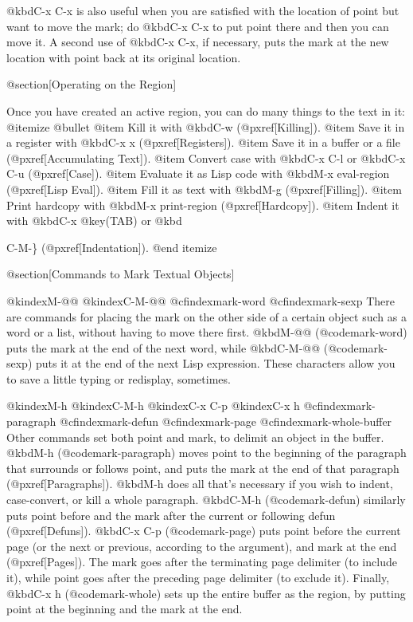 {{{{  @kbd{C-x C-x} is also useful when you are satisfied with the location of
point but want to move the mark; do @kbd{C-x C-x} to put point there and
then you can move it.  A second use of @kbd{C-x C-x}, if necessary, puts
the mark at the new location with point back at its original location.

@section[Operating on the Region]

  Once you have created an active region, you can do many things to
the text in it:
@itemize @bullet
@item
Kill it with @kbd{C-w} (@pxref[Killing]).
@item
Save it in a register with @kbd{C-x x} (@pxref[Registers]).
@item
Save it in a buffer or a file (@pxref[Accumulating Text]).
@item
Convert case with @kbd{C-x C-l} or @kbd{C-x C-u} (@pxref[Case]).
@item
Evaluate it as Lisp code with @kbd{M-x eval-region} (@pxref[Lisp Eval]).
@item
Fill it as text with @kbd{M-g} (@pxref[Filling]).
@item
Print hardcopy with @kbd{M-x print-region} (@pxref[Hardcopy]).
@item
Indent it with @kbd{C-x @key(TAB)} or @kbd{C-M-\} (@pxref[Indentation]).
@end itemize

@section[Commands to Mark Textual Objects]

@kindex{M-@@}
@kindex{C-M-@@}
@cfindex{mark-word}
@cfindex{mark-sexp}
  There are commands for placing the mark on the other side of a certain
object such as a word or a list, without having to move there first.
@kbd{M-@@} (@code{mark-word}) puts the mark at the end of the next word,
while @kbd{C-M-@@} (@code{mark-sexp}) puts it at the end of the next Lisp
expression.  These characters allow you to save a little typing or
redisplay, sometimes.

@kindex{M-h}
@kindex{C-M-h}
@kindex{C-x C-p}
@kindex{C-x h}
@cfindex{mark-paragraph}
@cfindex{mark-defun}
@cfindex{mark-page}
@cfindex{mark-whole-buffer}
   Other commands set both point and mark, to delimit an object in the
buffer.  @kbd{M-h} (@code{mark-paragraph}) moves point to the beginning of
the paragraph that surrounds or follows point, and puts the mark at the end
of that paragraph (@pxref[Paragraphs]).  @kbd{M-h} does all that's
necessary if you wish to indent, case-convert, or kill a whole paragraph.
@kbd{C-M-h} (@code{mark-defun}) similarly puts point before and the mark
after the current or following defun (@pxref[Defuns]).  @kbd{C-x C-p}
(@code{mark-page}) puts point before the current page (or the next or
previous, according to the argument), and mark at the end (@pxref[Pages]).
The mark goes after the terminating page delimiter (to include it), while
point goes after the preceding page delimiter (to exclude it).  Finally,
@kbd{C-x h} (@code{mark-whole}) sets up the entire buffer as the region, by
putting point at the beginning and the mark at the end.

}}}}}
